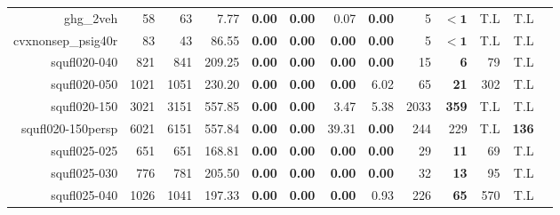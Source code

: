 \begin{landscape}
\begin{table*}[t]
\begin{tabular}{|r|r|r||r||r|r|r|r||r|r|r|r|r|}
                           ghg\_2veh &            58 &            63 &                              7.77 &  \textbf{0.00} &  \textbf{0.00} &           0.07 &  \textbf{0.00} &                  5 &         $\bm{< 1}$ &                T.L &                T.L \\ 
                  cvxnonsep\_psig40r &            83 &            43 &                             86.55 &  \textbf{0.00} &  \textbf{0.00} &  \textbf{0.00} &  \textbf{0.00} &                  5 &         $\bm{< 1}$ &                T.L &                T.L \\ 
                        squfl020-040 &           821 &           841 &                            209.25 &  \textbf{0.00} &  \textbf{0.00} &  \textbf{0.00} &  \textbf{0.00} &                 15 &         \textbf{6} &                 79 &                T.L \\ 
                        squfl020-050 &          1021 &          1051 &                            230.20 &  \textbf{0.00} &  \textbf{0.00} &  \textbf{0.00} &           6.02 &                 65 &        \textbf{21} &                302 &                T.L \\ 
                        squfl020-150 &          3021 &          3151 &                            557.85 &  \textbf{0.00} &  \textbf{0.00} &           3.47 &           5.38 &               2033 &       \textbf{359} &                T.L &                T.L \\ 
                   squfl020-150persp &          6021 &          6151 &                            557.84 &  \textbf{0.00} &  \textbf{0.00} &          39.31 &  \textbf{0.00} &                244 &                229 &                T.L &       \textbf{136} \\ 
                        squfl025-025 &           651 &           651 &                            168.81 &  \textbf{0.00} &  \textbf{0.00} &  \textbf{0.00} &  \textbf{0.00} &                 29 &        \textbf{11} &                 69 &                T.L \\ 
                        squfl025-030 &           776 &           781 &                            205.50 &  \textbf{0.00} &  \textbf{0.00} &  \textbf{0.00} &  \textbf{0.00} &                 32 &        \textbf{13} &                 95 &                T.L \\ 
                        squfl025-040 &          1026 &          1041 &                            197.33 &  \textbf{0.00} &  \textbf{0.00} &  \textbf{0.00} &           0.93 &                226 &        \textbf{65} &                570 &                T.L \\ 

\end{tabular}
\end{table*}
\end{landscape}
